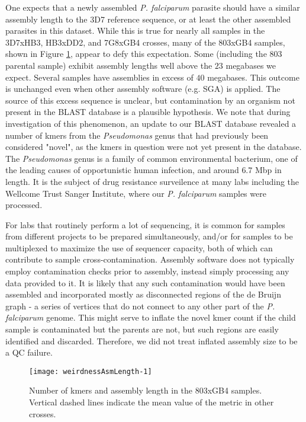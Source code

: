 One expects that a newly assembled \textit{P. falciparum} parasite should have a similar assembly length to the 3D7 reference sequence, or at least the other assembled parasites in this dataset.  While this is true for nearly all samples in the 3D7xHB3, HB3xDD2, and 7G8xGB4 crosses, many of the 803xGB4 samples, shown in Figure \ref{fig:weirdnessAsmLength}, appear to defy this expectation.  Some (including the 803 parental sample) exhibit assembly lengths well above the $23$ megabases we expect.  Several samples have assemblies in excess of $40$ megabases.  This outcome is unchanged even when other assembly software (e.g. SGA) is applied.  The source of this excess sequence is unclear, but contamination by an organism not present in the BLAST database is a plausible hypothesis.  We note that during investigation of this phenomenon, an update to our BLAST database revealed a number of kmers from the \textit{Pseudomonas} genus that had previously been considered "novel", as the kmers in question were not yet present in the database.  The \textit{Pseudomonas} genus is a family of common environmental bacterium, one of the leading causes of opportunistic human infection\cite{Stover:2000dy}, and around $6.7$ Mbp in length.  It is the subject of drug resistance surveilence\cite{Winsor:2016ca} at many labs including the Wellcome Trust Sanger Institute, where our \textit{P. falciparum} samples were processed.

For labs that routinely perform a lot of sequencing, it is common for samples from different projects to be prepared simultaneously, and/or for samples to be multiplexed to maximize the use of sequencer capacity, both of which can contribute to sample cross-contamination\cite{Jun:2012je}.  Assembly software does not typically employ contamination checks prior to assembly, instead simply processing any data provided to it.  It is likely that any such contamination would have been assembled and incorporated mostly as disconnected regions of the de Bruijn graph - a series of vertices that do not connect to any other part of the \textit{P. falciparum} genome.  This might serve to inflate the novel kmer count if the child sample is contaminated but the parents are not, but such regions are easily identified and discarded.  Therefore, we did not treat inflated assembly size to be a QC failure.

\begin{figure}[h!]
  \centering
    \texttt{[image: weirdnessAsmLength-1]}
  \caption{Number of kmers and assembly length in the 803xGB4 samples.  Vertical dashed lines indicate the mean value of the metric in other crosses.}
  \label{fig:weirdnessAsmLength}
\end{figure}


